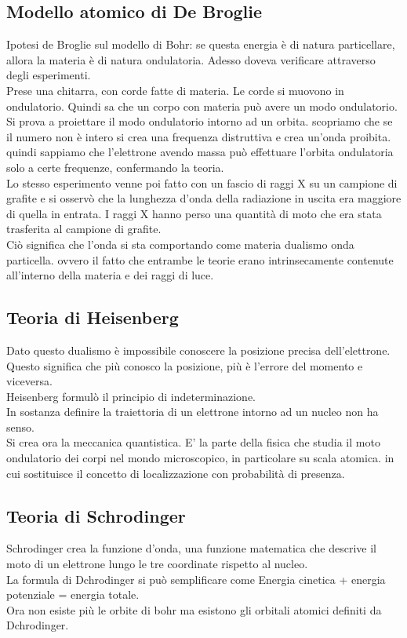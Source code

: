 \subsection{Modello atomico di De Broglie}
Ipotesi de Broglie sul modello di Bohr: se questa energia è di natura particellare, allora la materia è di natura ondulatoria. Adesso doveva verificare attraverso degli esperimenti.\\
Prese una chitarra, con corde fatte di materia. Le corde si muovono in  ondulatorio. Quindi sa che un corpo con materia può avere un modo ondulatorio. \\
Si prova a proiettare il modo ondulatorio intorno ad un orbita. scopriamo che se il numero non è intero si crea una frequenza distruttiva e crea un’onda proibita. quindi sappiamo che l’elettrone avendo massa può effettuare l’orbita ondulatoria solo a certe frequenze, confermando la teoria.\\
Lo stesso esperimento venne poi fatto con un fascio di raggi X su un campione di grafite e si osservò che la lunghezza d’onda della radiazione in uscita era maggiore di quella in entrata. I raggi X hanno perso una quantità di moto che era stata trasferita al campione di grafite. \\
Ciò significa che l’onda si sta comportando come materia dualismo onda particella. ovvero il fatto che entrambe le teorie erano intrinsecamente contenute all’interno della materia e dei raggi di luce.
\subsection{Teoria di Heisenberg}
Dato questo dualismo è impossibile conoscere la posizione precisa dell’elettrone. Questo significa che più conosco la posizione, più è l’errore del momento e viceversa. \\
Heisenberg formulò il principio di indeterminazione.\\
In sostanza definire la traiettoria di un elettrone intorno ad un nucleo non ha senso.\\
Si crea ora la meccanica quantistica. E’ la parte della fisica che studia il moto ondulatorio dei corpi nel mondo microscopico, in particolare su scala atomica. in cui sostituisce il concetto di localizzazione con probabilità di presenza.
\subsection*{Teoria di Schrodinger}
Schrodinger crea la funzione d’onda, una funzione matematica che descrive il moto di un elettrone lungo le tre coordinate rispetto al nucleo.\\
La formula di Dchrodinger si può semplificare come Energia cinetica + energia potenziale = energia totale. \\
Ora non esiste più le orbite di bohr ma esistono gli orbitali atomici definiti da Dchrodinger. 
